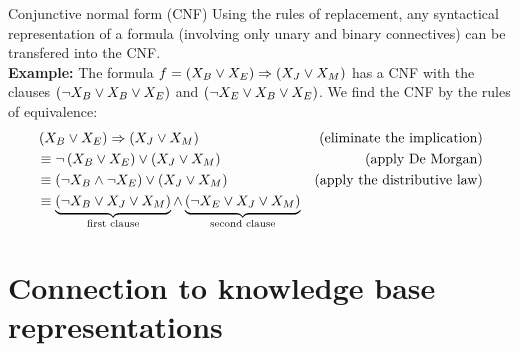 \documentclass{beamer}
\begin{document}
    \begin{frame}{Conjunctive normal form (CNF)}
        Using the rules of replacement, any syntactical representation of a formula (involving only unary and binary connectives) can be transfered into the CNF.
        \medskip \\
        {\bf Example:} The formula $f = \left(X_{B} \lor X_{E}\right) \Rightarrow \left(X_{J} \lor X_{M}\right)$
        has a CNF with the clauses $\left(\lnot X_{B} \lor X_{B} \lor X_{E}\right)$ and $\left(\lnot X_{E} \lor X_{B} \lor X_{E}\right)$.
        We find the CNF by the rules of equivalence:
        \begin{align*}
            &\left(\catvariableof{B} \lor \catvariableof{E}\right) \Rightarrow \left(\catvariableof{J} \lor \catvariableof{M}\right)  & \text{(eliminate the implication)}\\
            &\equiv \lnot \left(\catvariableof{B} \lor \catvariableof{E}\right) \lor \left(\catvariableof{J} \lor \catvariableof{M}\right) & \text{(apply De Morgan)}\\
            &\equiv \left(\lnot\catvariableof{B} \land \lnot\catvariableof{E}\right) \lor \left(\catvariableof{J} \lor \catvariableof{M}\right) & \text{(apply the distributive law)}\\ %
            &\equiv \underbrace{\left(\lnot\catvariableof{B} \lor \catvariableof{J} \lor \catvariableof{M}\right)}_{\text{first clause}}
            \land \underbrace{\left(\lnot\catvariableof{E} \lor \catvariableof{J} \lor \catvariableof{M}\right)}_{\text{second clause}}&
        \end{align*}

    \end{frame}


    \section{Connection to knowledge base representations}
\end{document}
